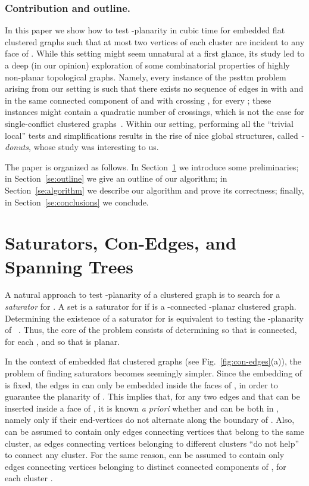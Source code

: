 \documentclass[letter,runningheads]{llncs}
\begin{document}
\subsubsection*{Contribution and outline.} In this paper we show how to test -planarity in cubic time for embedded flat clustered graphs  such that at most two vertices of each cluster are incident to any face of . While this setting might seem unnatural at a first glance, its study led to a deep (in our opinion) exploration of some combinatorial properties of highly non-planar topological graphs. Namely, every instance  of the {\sc pssttm} problem arising from our setting is such that there exists no sequence  of edges in  with  and  in the same connected component of  and with  crossing , for every ; these instances might contain a quadratic number of crossings, which is not the case for single-conflict clustered graphs~\cite{df-ectefcgsf-09}. Within our setting, performing all the ``trivial local'' tests and simplifications results in the rise of nice global structures, called {\em -donuts}, whose study was interesting to us.

The paper is organized as follows. In Section~\ref{se:preliminaries} we introduce some preliminaries; in Section~\ref{se:outline} we give an outline of our algorithm; in Section~\ref{se:algorithm} we describe our algorithm and prove its correctness; finally, in Section~\ref{se:conclusions} we conclude.

\section{Saturators, Con-Edges, and Spanning Trees} \label{se:preliminaries}

A natural approach to test -planarity of a clustered graph  is to search for a {\em saturator} for . A set  is a saturator for  if  is a -connected -planar clustered graph. Determining the existence of a saturator for  is equivalent to testing the -planarity of ~\cite{fce-pcg-95}. Thus, the core of the problem consists of determining  so that  is connected, for each , and so that  is planar.

In the context of embedded flat clustered graphs (see Fig.~\ref{fig:con-edges}(a)), the problem of finding saturators becomes seemingly simpler. Since the embedding of  is fixed, the edges in  can only be embedded inside the faces of , in order to guarantee the planarity of . This implies that, for any two edges  and  that can be inserted inside a face  of , it is known {\em a priori} whether  and  can be both in , namely only if their end-vertices do not alternate along the boundary of . Also,  can be assumed to contain only edges connecting vertices that belong to the same cluster, as edges connecting vertices belonging to different clusters ``do not help'' to connect any cluster. For the same reason,  can be assumed to contain only edges connecting vertices belonging to distinct connected components of , for each cluster .
\end{document}
